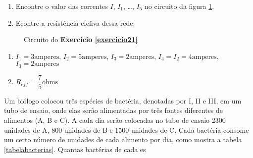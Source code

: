 \documentclass[12pt]{exam}
\begin{document}
\begin{exercicio}\label{exercicio21}
  \begin{enumerate}
    \item Encontre o valor das correntes $I$, $I_1$, \dots, $I_5$ no circuito da figura \ref{exercicio21circuitopoole}.
    \item Econtre a resistência efefiva dessa rede.
  \end{enumerate}
  \begin{figure}
    \centering
    
    \caption{Circuito do \textbf{Exercício \ref{exercicio21}}}
    \label{exercicio21circuitopoole}
  \end{figure}
  \begin{solucao}
    \begin{enumerate}
      \item $I_1 = 3 \mbox{amperes}$, $I_2 = 5 \mbox{amperes}$, $I_3 = 2 \mbox{amperes}$, $I_4 = I_2 =  4\mbox{amperes}$, $I_3 = 2 \mbox{amperes}$
      \item $R_{eff} = \dfrac{7}{5} \mbox{ohms}$
    \end{enumerate}
  \end{solucao}
\end{exercicio}

\begin{exercicio}
  Um biólogo colocou três espécies de bactéria, denotadas por I, II e III, em um tubo de ensaio, onde elas serão alimentadas por três fontes diferentes de alimentos (A, B e C). A cada dia serão colocadas no tubo de ensaio 2300 unidades de A, 800 unidades de B e 1500 unidades de C. Cada bactéria consome um certo número de unidades de cada alimento por dia, como mostra a tabela \ref{tabelabacterias}. Quantas bactérias de cada es
\end{exercicio}
\end{document}
